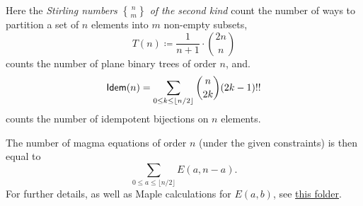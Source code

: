 Here the {\it Stirling numbers $n \brace m$ of the second kind} count the number of ways to partition a set of $n$ elements into $m$ non-empty subsets,
$$
T(n) \coloneq \frac{1}{n+1} \cdot \binom{2n}{n}
$$
counts the number of plane binary trees of order $n$, and.
$$
{\sf Idem}(n) = \sum_{0 \leq k \leq \lfloor n/2 \rfloor}  {n\choose 2k} (2k-1)!!
$$
counts the number of idempotent bijections on $n$ elements.

The number of magma equations of order $n$ (under the given constraints) is then equal to
$$\sum_{0 \le a \le \lfloor n/2 \rfloor } E(a,n-a) .
$$
For further details, as well as Maple calculations for $E(a,b)$, see \href{https://github.com/teorth/equational_theories/tree/main/scripts/count_magma_eqns}{this folder}.
